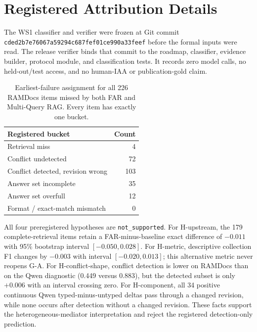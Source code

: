 \section{Registered Attribution Details}
\label{app:attribution}

The WS1 classifier and verifier were frozen at Git commit
\texttt{cded2b7e76067a59294c687fef01ce990a33feef} before the formal inputs were
read. The release verifier binds that commit to the roadmap, classifier,
evidence builder, protocol module, and classification tests. It records zero
model calls, no held-out/test access, and no human-IAA or publication-gold
claim.

\begin{table}[h]
\caption{Earliest-failure assignment for all 226 RAMDocs items missed by both
FAR and Multi-Query RAG. Every item has exactly one bucket.}
\label{tab:failure-buckets}
\begin{center}
\small
\begin{tabular}{lr}
\toprule
Registered bucket & Count \\
\midrule
Retrieval miss & 4 \\
Conflict undetected & 72 \\
Conflict detected, revision wrong & 103 \\
Answer set incomplete & 35 \\
Answer set overfull & 12 \\
Format / exact-match mismatch & 0 \\
\bottomrule
\end{tabular}
\end{center}
\end{table}

All four preregistered hypotheses are \texttt{not\_supported}. For
H-upstream, the 179 complete-retrieval items retain a FAR-minus-baseline exact
difference of $-0.011$ with 95\% bootstrap interval $[-0.050,0.028]$. For
H-metric, descriptive collection F1 changes by $-0.003$ with interval
$[-0.020,0.013]$; this alternative metric never reopens G-A. For
H-conflict-shape, conflict detection is lower on RAMDocs than on the Qwen
diagnostic (0.449 versus 0.883), but the detected subset is only $+0.006$ with
an interval crossing zero. For H-component, all 34 positive continuous Qwen
typed-minus-untyped deltas pass through a changed revision, while none occurs
after detection without a changed revision. These facts support the
heterogeneous-mediator interpretation and reject the registered detection-only
prediction.

